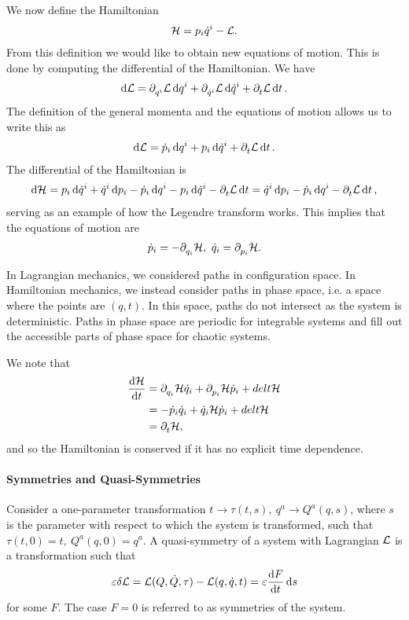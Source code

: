 We now define the Hamiltonian
\begin{align*}
	\mathcal{H} = p_{i}\dot{q}^{i} - \mathcal{L}.
\end{align*}
From this definition we would like to obtain new equations of motion. This is done by computing the differential of the Hamiltonian. We have
\begin{align*}
	\dd{\mathcal{L}} = \partial^{}_{q^{i}}\mathcal{L}\dd{q^{i}} + \partial^{}_{\dot{q}^{i}}\mathcal{L}\dd{\dot{q}^{i}} + \partial^{}_{t}\mathcal{L}\dd{t}.
\end{align*}
The definition of the general momenta and the equations of motion allows us to write this as
\begin{align*}
	\dd{\mathcal{L}} = \dot{p}_{i}\dd{q^{i}} + p_{i}\dd{\dot{q}^{i}} + \partial^{}_{t}\mathcal{L}\dd{t}.
\end{align*}
The differential of the Hamiltonian is
\begin{align*}
	\dd{\mathcal{H}} = p_{i}\dd{\dot{q}^{i}} + \dot{q}^{i}\dd{p_{i}} - \dot{p}_{i}\dd{q^{i}} - p_{i}\dd{\dot{q}^{i}} - \partial^{}_{t}\mathcal{L}\dd{t} = \dot{q}^{i}\dd{p_{i}} - \dot{p}_{i}\dd{q^{i}} - \partial^{}_{t}\mathcal{L}\dd{t},
\end{align*}
serving as an example of how the Legendre transform works. This implies that the equations  of motion are
\begin{align*}
	\dot{p}_{i} = -\partial^{}_{q_{i}}\mathcal{H},\ \dot{q}_{i} = \partial^{}_{p_{i}}\mathcal{H}.
\end{align*}

In Lagrangian mechanics, we considered paths in configuration space. In Hamiltonian mechanics, we instead consider paths in phase space, i.e. a space where the points are $(q, t)$. In this space, paths do not intersect as the system is deterministic. Paths in phase space are periodic for integrable systems and fill out the accessible parts of phase space for chaotic systems.

We note that
\begin{align*}
	\dv{\mathcal{H}}{t} &= \partial^{}_{q_{i}}\mathcal{H}\dot{q}_{i} + \partial^{}_{p_{i}}\mathcal{H}\dot{p}_{i} + del{t}{\mathcal{H}} \\
	             &= -\dot{p}_{i}\dot{q}_{i} + \dot{q}_{i}{\mathcal{H}}\dot{p}_{i} + del{t}{\mathcal{H}} \\
	             &= \partial^{}_{t}\mathcal{H},
\end{align*}
and so the Hamiltonian is conserved if it has no explicit time dependence.



\paragraph{Symmetries and Quasi-Symmetries}
Consider a one-parameter transformation $t\to\tau(t, s),\ q^{a}\to Q^{a}(q, s)$, where $s$ is the parameter with respect to which the system is transformed, such that $\tau(t, 0) = t,\ Q^{a}(q, 0) = q^{a}$. A quasi-symmetry of a system with Lagrangian $\mathcal{L}$ is a transformation such that
\begin{align*}
	\varepsilon\delta \mathcal{L} = \mathcal{L}(Q, \dot{Q}, \tau) - \mathcal{L}(q, \dot{q}, t) = \varepsilon\dv{F}{t}\dd{s}
\end{align*}
for some $F$. The case $F = 0$ is referred to as symmetries of the system.

